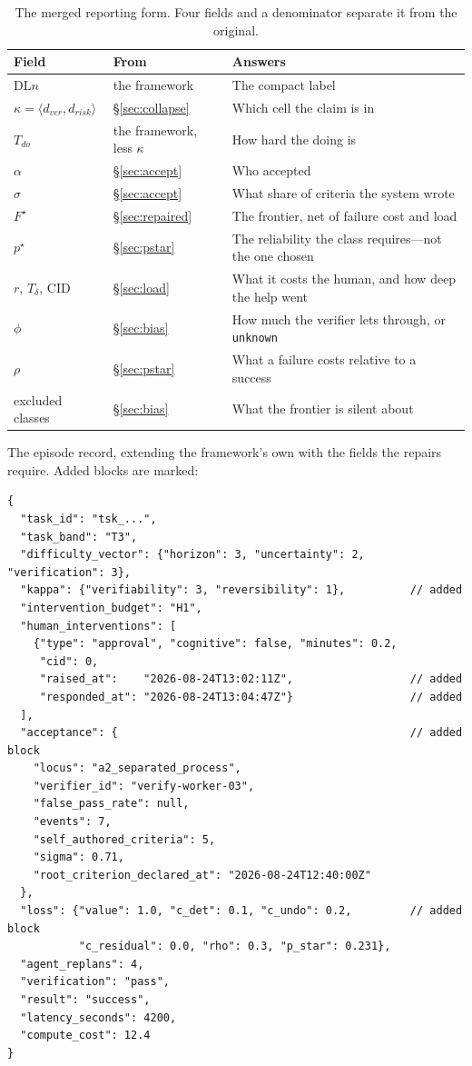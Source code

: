 \documentclass[11pt]{article}
\theoremstyle{definition}
\newcommand{\Td}{\ensuremath{T_\delta}}
\newcommand{\pstar}{\ensuremath{p^{\star}}}
\newcommand{\dver}{\ensuremath{d_{ver}}}
\newcommand{\drisk}{\ensuremath{d_{risk}}}
\newcommand{\kap}{\ensuremath{\kappa}}
\begin{document}
\begin{table}[h]
\centering\small
\begin{tabularx}{\textwidth}{@{}llY@{}}
\toprule
Field & From & Answers \\
\midrule
DL$n$ & the framework & The compact label \\
$\kap=\langle \dver,\drisk\rangle$ & \S\ref{sec:collapse} & Which cell the claim is in \\
$T_{do}$ & the framework, less \kap{} & How hard the doing is \\
$\alpha$ & \S\ref{sec:accept} & Who accepted \\
$\sigma$ & \S\ref{sec:accept} & What share of criteria the system wrote \\
$F^{\star}$ & \S\ref{sec:repaired} & The frontier, net of failure cost and load \\
$\pstar$ & \S\ref{sec:pstar} & The reliability the class requires---not the one chosen \\
$r$, \Td{}, CID & \S\ref{sec:load} & What it costs the human, and how deep the help went \\
$\phi$ & \S\ref{sec:bias} & How much the verifier lets through, or \texttt{unknown} \\
$\rho$ & \S\ref{sec:pstar} & What a failure costs relative to a success \\
excluded classes & \S\ref{sec:bias} & What the frontier is silent about \\
\bottomrule
\end{tabularx}
\caption{The merged reporting form. Four fields and a denominator separate it from the original.}
\end{table}

The episode record, extending the framework's own with the fields the repairs require. Added blocks are marked:

\small
\begin{verbatim}
{
  "task_id": "tsk_...",
  "task_band": "T3",
  "difficulty_vector": {"horizon": 3, "uncertainty": 2, "verification": 3},
  "kappa": {"verifiability": 3, "reversibility": 1},          // added
  "intervention_budget": "H1",
  "human_interventions": [
    {"type": "approval", "cognitive": false, "minutes": 0.2,
     "cid": 0,
     "raised_at":    "2026-08-24T13:02:11Z",                  // added
     "responded_at": "2026-08-24T13:04:47Z"}                  // added
  ],
  "acceptance": {                                             // added block
    "locus": "a2_separated_process",
    "verifier_id": "verify-worker-03",
    "false_pass_rate": null,
    "events": 7,
    "self_authored_criteria": 5,
    "sigma": 0.71,
    "root_criterion_declared_at": "2026-08-24T12:40:00Z"
  },
  "loss": {"value": 1.0, "c_det": 0.1, "c_undo": 0.2,         // added block
           "c_residual": 0.0, "rho": 0.3, "p_star": 0.231},
  "agent_replans": 4,
  "verification": "pass",
  "result": "success",
  "latency_seconds": 4200,
  "compute_cost": 12.4
}
\end{verbatim}
\normalsize
\end{document}
